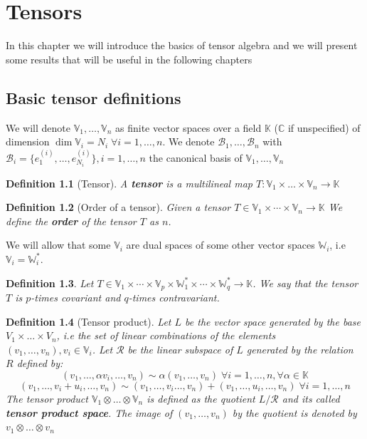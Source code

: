 \documentclass[11pt,a4paper,openright,oneside]{book}
\numberwithin{equation}{section}
\newtheorem{defn0}{Definition}[chapter]
\newenvironment{definition}{ \begin{defn0}}{\end{defn0}}
\begin{document}
\fi



\chapter{Tensors}

In this chapter we will introduce the basics of tensor algebra and we will present some results that will be useful in the
following chapters

\section{Basic tensor definitions}

We will denote $\mathbb{V}_1, \dots, \mathbb{V}_n$ as finite vector spaces over a field $\mathbb{K}$ ($\mathbb{C}$ if unspecified) of dimension $\dim{\mathbb{V}_i} = N_i \; \forall i = 1, \dots, n$.
We denote $\mathcal{B}_1, \dots, \mathcal{B}_n$ with ${\mathcal{B}_i = \{e_1^{(i)}, \dots, e_{N_i}^{(i)}\}, i = 1, \dots, n}$ the canonical basis of $\mathbb{V}_1, \dots, \mathbb{V}_n$

\begin{definition}[Tensor]
    A \textbf{tensor} is a multilineal map ${T: \mathbb{V}_1 \times \dots \times \mathbb{V}_n \rightarrow \mathbb{K}}$
\end{definition}

\begin{definition}[Order of a tensor] Given a tensor $T \in \mathbb{V}_1 \times \cdots \times \mathbb{V}_n \rightarrow \mathbb{K}$ We define the \textbf{order} of the tensor $T$ as $n$.
\end{definition}

We will allow that some $\mathbb{V}_i$ are dual spaces of some other vector spaces $\mathbb{W}_i$, i.e $\mathbb{V}_i = \mathbb{W}_i^*$.
\begin{definition}
    Let $T \in \mathbb{V}_1 \times \cdots \times \mathbb{V}_p \times \mathbb{W}_1^* \times \cdots \times \mathbb{W}_q^* \rightarrow \mathbb{K}$.
    We say that the tensor $T$ is $p$-times covariant and $q$-times contravariant.
\end{definition}

\begin{definition}[Tensor product] Let $L$ be the vector space generated by the base ${V_1 \times \dots \times V_n}$, i.e the
    set of linear combinations of the elements $(v_1, \dots, v_n), v_i \in \mathbb{V}_i$. Let $\mathcal{R}$ be the linear subspace of
    $L$ generated by the relation $R$ defined by:
    $$(v_1, \dots, \alpha v_i, \dots, v_n) \sim \alpha(v_1, \dots, v_n) \; \forall i = 1, \dots, n, \forall \alpha \in \mathbb{K}$$
    $$(v_1, \dots, v_i + u_i, \dots, v_n) \sim (v_1, \dots, v_i \dots, v_n) + (v_1, \dots, u_i, \dots, v_n) \; \forall i = 1, \dots, n$$
    The tensor product $\mathbb{V}_1 \otimes \dots \otimes \mathbb{V}_n$ is defined as the quotient $L / \mathcal{R}$ and its called 
    \textbf{tensor product space}. The image of
    $(v_1, \dots, v_n)$ by the quotient is denoted by $v_1 \otimes \dots \otimes v_n$
\end{definition}
\end{document}
